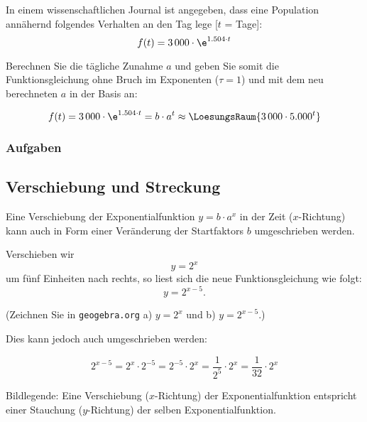 In einem wissenschaftlichen Journal ist angegeben, dass eine Population annähernd folgendes Verhalten an den Tag lege [$t$ = Tage]:
$$f(t) = 3\,000\cdot{}\e^{1.504\cdot{}t}$$

Berechnen Sie die tägliche Zunahme $a$ und geben Sie somit die Funktionsgleichung ohne Bruch im Exponenten ($\tau = 1$) und mit dem neu berechneten $a$ in der Basis an:

$$f(t) = 3\,000\cdot{}\e^{1.504\cdot{}t} = b\cdot{}a^t \approx \LoesungsRaum{3\,000\cdot{}5.000^t}$$



\subsubsection*{Aufgaben}
\newpage


\subsection{Verschiebung und Streckung }

Eine Verschiebung der Exponentialfunktion $y=b\cdot{}a^x$ in der Zeit ($x$-Richtung) kann auch in Form einer Veränderung der Startfaktors $b$ umgeschrieben werden.

Verschieben wir \zB $$y=2^x$$ um fünf Einheiten nach rechts, so liest sich die neue Funktionsgleichung wie folgt:
$$y=2^{x-5}.$$

(Zeichnen Sie in \texttt{geogebra.org} a) $y=2^x$ und b) $y=2^{x-5}$.)

Dies kann jedoch auch umgeschrieben werden:

$$2^{x-5} = 2^x \cdot{} 2^{-5} = 2^{-5} \cdot{} 2^x = \frac{1}{2^5} \cdot{} 2^x =
\frac{1}{32}\cdot{}2^x$$

Bildlegende: Eine Verschiebung ($x$-Richtung) der Exponentialfunktion entspricht einer Stauchung ($y$-Richtung) der selben Exponentialfunktion.

